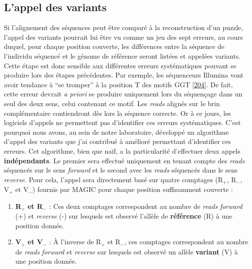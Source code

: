 \documentclass[12pt,a4paper,twoside]{ugathesis}
\providecommand{\tightlist}{%
  \setlength{\itemsep}{0pt}\setlength{\parskip}{0pt}}
\theoremstyle{definition}
\theoremstyle{definition}
\theoremstyle{definition}
\theoremstyle{remark}
\begin{document}
\newpage

\subsection{L'appel des variants}\label{lappel-des-variants}

Si l'alignement des séquences peut être comparé à la reconstruction d'un
puzzle, l'appel des variants pourrait lui être vu comme un jeu des sept
erreurs, au cours duquel, pour chaque position couverte, les différences
entre la séquence de l'individu séquencé et le génome de référence
seront listées et appelées variants. Cette étape est donc sensible aux
différentes erreurs systématiques pouvant se produire lors des étapes
précédentes. Par exemple, les séquenceurs Illumina vont avoir tendance à
``se tromper'' à la position T des motifs GGT
{[}\protect\hyperlink{ref-Robinson2011}{204}{]}. De fait, cette erreur
devrait \emph{a priori} se produire uniquement lors du séquençage dans
un seul des deux sens, celui contenant ce motif. Les \emph{reads}
alignés sur le brin complémentaire contiendront dès lors la séquence
correcte. Or à ce jours, les logiciels d'appels ne permettent pas
d'identifier ces erreurs systématiques. C'est pourquoi nous avons, au
sein de notre laboratoire, développé un algorithme d'appel des variants
que j'ai contribué à amélioré permettant d'identifier ces erreurs. Cet
algorithme, bien que naïf, a la particularité d'effectuer deux appels
\textbf{indépendants}. Le premier sera effectué uniquement en tenant
compte des \emph{reads} séquencés sur le sens \emph{forward} et le
second avec les \emph{reads} séquencés dans le sens \emph{reverse}. Pour
cela, l'appel sera directement basé sur quatre comptages (R\(_+\),
R\(_-\), V\(_+\) et V\(_-\)) fournis par MAGIC pour chaque position
suffisamment couverte :

\begin{enumerate}
\def\labelenumi{\arabic{enumi}.}
\tightlist
\item
  \textbf{R}\(_+\) \textbf{et R}\(_-\) : Ces deux comptages
  correspondent au nombre de \emph{reads} \emph{forward} (+) et
  \emph{reverse} (-) sur lesquels est observé l'allèle de
  \textbf{référence} (R) à une position donnée.\\
\item
  \textbf{V}\(_+\) \textbf{et V}\(_-\) : À l'inverse de R\(_+\) et
  R\(_-\), ces comptages correspondent au nombre de \emph{reads}
  \emph{forward} et \emph{reverse} sur lesquels est observé un allèle
  \textbf{variant} (V) à une position donnée.
\end{enumerate}
\end{document}
